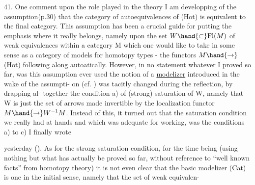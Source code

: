41. One comment  upon the role played in the theory I am developping of
the assumption\allowbreak{}(p.30) that the category of autoequivalences of (Hot) is
equivalent to the final category. This assumption has been a crucial
guide for putting the emphasis where it really belongs, namely upon
the set  $W\hand{\subset}\mathrm{Fl}(M)$ of weak equivalences within a category M which one
would like to take in some sense as a category of models for homotopy
types - the functors $M\hand{\to}$(Hot) following along autoatically. However,
in no statement whatever I proved so far, was this assumption ever used
 the notion of a \uline{modelizer} introduced in the wake of the assumpti-%
on (cf. ) was tacitly changed during the reflection, by drapping al-%
together the condition a) of (strong) saturation of W, namely that W is
just the set of arrows\unsure{\hand{,}} made invertible by the localization functor $M\hand{\to}W^{-1}M$.
Instead of this, it turned out that the saturation condition we really had
at hands and which  was adequate for working, was the conditions
a) to c) I finally wrote  yesterday (). As for the
strong saturation condition, for the time being (using nothing but what
has actually be proved so far, without reference to ``well known facts''
from homotopy theory)\hand{,} it is not even clear that the basic modelizer
(Cat) is one in the initial sense, namely that the set of weak equivalen-

